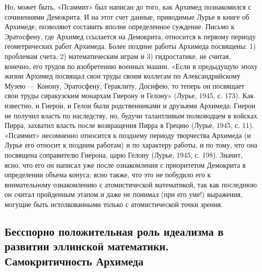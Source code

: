 Но,  может   быть,  «Псаммит»  был   написан  до  того,   как  Архимед
познакомился  с   сочинениями  Демокрита.  И  на   этот  счет  данные,
приводимые  Лурье  в книге  об  Архимеде,  позволяют составить  вполне
определенное суждение.  Письмо к Эратосфену, где  Архимед ссылается на
Демокрита, относится к первому  периоду геометрических работ Архимеда.
Более  поздние  работы  Архимеда  посвящены: 1)  проблемам  счета,  2)
математическим  играм  и  3)  гидростатике, не  считая,  конечно,  его
трудов по  изобретению военных машин.  «Если в предыдущую  эпоху жизни
Архимед посвящал  свои труды своим коллегам  по Александрийскому Музею
---  Конону, Эратосфену,  Гераклиту, Досифею,  то теперь  он посвящает
свои  труды  сиракузским  монархам  Гиерону и  Гелону»  (Лурье,  1945,
с.  173).  Как известно,  и  Гиерон,  и  Гелон были  родственниками  и
друзьями  Архимеда;  Гиерон  не  получил  власть  по  наследству,  но,
будучи талантливым полководцем в  войсках Пирра, захватил власть после
возвращения Пирра в Грецию (Лурье,  1945, с. 11). «Псаммит» несомненно
относится к позднему периоду творчества  Архимеда (и Лурье его относит
к поздним работам) и по характеру работы, и по тому, что она посвящена
соправителю Гиерона, царю Гелону (Лурье,  1945, с. 198). Значит, ясно,
что его  он написал уже  после ознакомления с приоритетом  Демокрита в
определении  объема конуса;  ясно также,  что  это не  побудило его  к
внимательному  ознакомлению  с  атомистической  математикой,  так  как
последнюю он считал пройденным этапом и даже не понимал (при его уме!)
выражения, могущие  быть истолкованными только с  атомистической точки
зрения.

\subsection{Бесспорно   положительная   роль  идеализма   в   развитии
эллинской математики. Самокритичность Архимеда}

